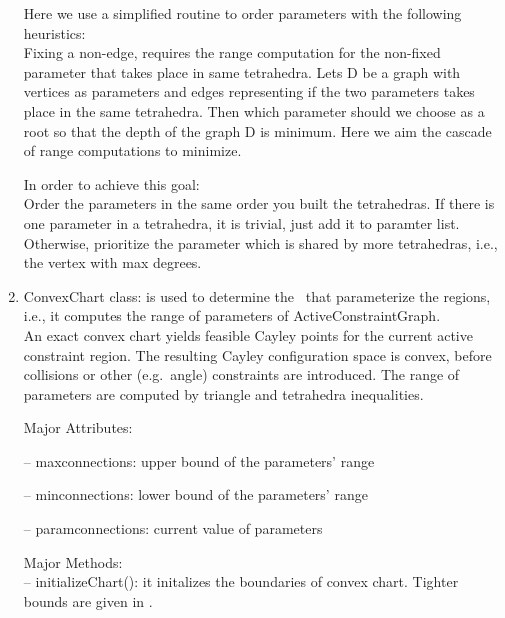 \begin{enumerate}
Here we use a simplified routine to order parameters with the following heuristics:\\
Fixing a non-edge, requires the range computation for the non-fixed parameter that takes place in same tetrahedra.
Lets D be a graph with vertices as parameters and edges representing if the two parameters takes place in the same tetrahedra.
Then which parameter should we choose as a root so that the depth of the graph D is minimum.
Here we aim the cascade of range computations to minimize.

In order to achieve this goal:\\
Order the parameters in the same order you built the tetrahedras. If there is one parameter in a tetrahedra, it is trivial, just add it to paramter list. Otherwise, prioritize the parameter which is shared by more tetrahedras, i.e., the vertex with max degrees.\\



\item \textsf{ConvexChart} class: is used to determine the \chart\ that parameterize the regions, i.e., it computes the range of parameters of ActiveConstraintGraph. \\
An exact convex chart yields feasible Cayley points for the current active constraint region.
The resulting Cayley configuration space is convex, before collisions or other (e.g.\ angle) constraints are introduced.
The range of parameters are computed by triangle and tetrahedra inequalities.

\smallskip
Major Attributes:

\noindent --  \textsf{maxconnections}: upper bound of the parameters' range

\noindent --  \textsf{minconnections}: lower bound of the parameters' range

\noindent --  \textsf{paramconnections}: current value of parameters

\smallskip
Major Methods:\\
\smallskip
\noindent --  \textsf{initializeChart()}: it initalizes the boundaries of convex chart.
Tighter bounds are given in \cite{ugandhar}.\\


\end{enumerate}
